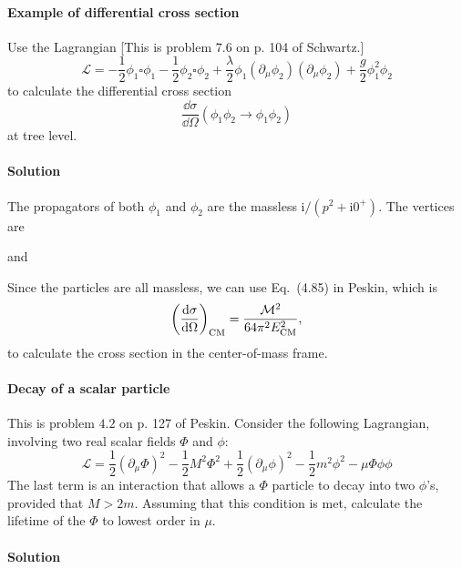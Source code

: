 \documentclass[hyperref, a4paper]{article}
\newcommand*{\ii}{\mathrm{i}}
\begin{document}
\paragraph{}

\paragraph{Example of differential cross section} Use the Lagrangian [This is problem $7.6$ on p. 104 of Schwartz.]
\[
\mathcal{L}=-\frac{1}{2} \phi_{1} \square \phi_{1}-\frac{1}{2} \phi_{2} \square \phi_{2}+\frac{\lambda}{2} \phi_{1}\left(\partial_{\mu} \phi_{2}\right)\left(\partial_{\mu} \phi_{2}\right)+\frac{g}{2} \phi_{1}^{2} \phi_{2}
\]
to calculate the differential cross section
\[
\frac{\dd \sigma}{\dd \Omega}\left(\phi_{1} \phi_{2} \rightarrow \phi_{1} \phi_{2}\right)
\]
at tree level.

\paragraph{Solution} The propagators of both $\phi_1$ and $\phi_2$ are the massless $\ii / (p^2 + \ii 0^+)$.
The vertices are 

and


Since the particles are all massless, we can use Eq.~(4.85) in Peskin, which is 
\begin{equation}
    \left(\dv{\sigma}{\Omega}\right)_\text{CM} = \frac{\mathcal{M}^2}{64 \pi^2 E_\text{CM}^2},  
\end{equation}
to calculate the cross section in the center-of-mass frame.

\paragraph{}

\paragraph{Decay of a scalar particle} This is problem $4.2$ on p. 127 of Peskin. Consider the following Lagrangian, involving two real scalar fields $\Phi$ and $\phi$:
\[
\mathcal{L}=\frac{1}{2}\left(\partial_{\mu} \Phi\right)^{2}-\frac{1}{2} M^{2} \Phi^{2}+\frac{1}{2}\left(\partial_{\mu} \phi\right)^{2}-\frac{1}{2} m^{2} \phi^{2}-\mu \Phi \phi \phi
\]
The last term is an interaction that allows a $\Phi$ particle to decay into two $\phi$'s, provided that $M>2 m$. Assuming that this condition is met, calculate the lifetime of the $\Phi$ to lowest order in $\mu$.

\paragraph{Solution}

\paragraph{}


 
\end{document}

